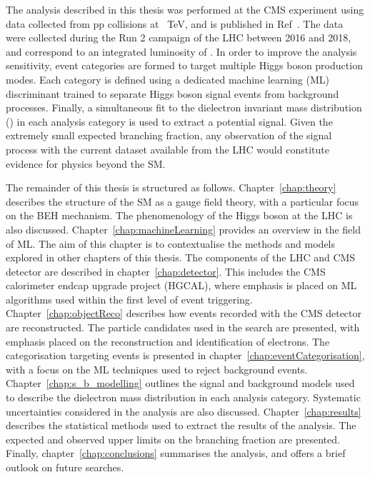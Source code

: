 The analysis described in this thesis was performed at the CMS experiment using data collected from pp collisions at \sqrts~TeV, and is published in Ref~\cite{HIG-21-015-PAS}. The data were collected during the Run 2 campaign of the LHC between 2016 and 2018, and correspond to an integrated luminosity of \intlumi. In order to improve the analysis sensitivity, event categories are formed to target multiple Higgs boson production modes. Each category is defined using a dedicated machine learning (ML) discriminant trained to separate Higgs boson signal events from background processes. Finally, a simultaneous fit to the dielectron invariant mass distribution (\mee) in each analysis category is used to extract a potential \Hee signal. Given the extremely small expected branching fraction, any observation of the signal process with the current dataset available from the LHC would constitute evidence for physics beyond the SM.

The remainder of this thesis is structured as follows. Chapter~\ref{chap:theory} describes the structure of the SM as a gauge field theory, with a particular focus on the BEH mechanism. The phenomenology of the Higgs boson at the LHC is also discussed. Chapter~\ref{chap:machineLearning} provides an overview in the field of ML. The aim of this chapter is to contextualise the methods and models explored in other chapters of this thesis. The components of the LHC and CMS detector are described in chapter~\ref{chap:detector}. This includes the CMS calorimeter endcap upgrade project (HGCAL), where emphasis is placed on ML algorithms used within the first level of event triggering. Chapter~\ref{chap:objectReco} describes how events recorded with the CMS detector are reconstructed. The particle candidates used in the \Hee search are presented, with emphasis placed on the reconstruction and identification of electrons. The categorisation targeting \Hee events is presented in chapter~\ref{chap:eventCategorisation}, with a focus on the ML techniques used to reject background events. Chapter~\ref{chap:s_b_modelling} outlines the signal and background models used to describe the dielectron mass distribution in each analysis category. Systematic uncertainties considered in the analysis are also discussed. Chapter~\ref{chap:results} describes the statistical methods used to extract the results of the analysis. The expected and observed upper limits on the \Hee branching fraction are presented. Finally, chapter~\ref{chap:conclusions} summarises the \Hee analysis, and offers a brief outlook on future searches.


